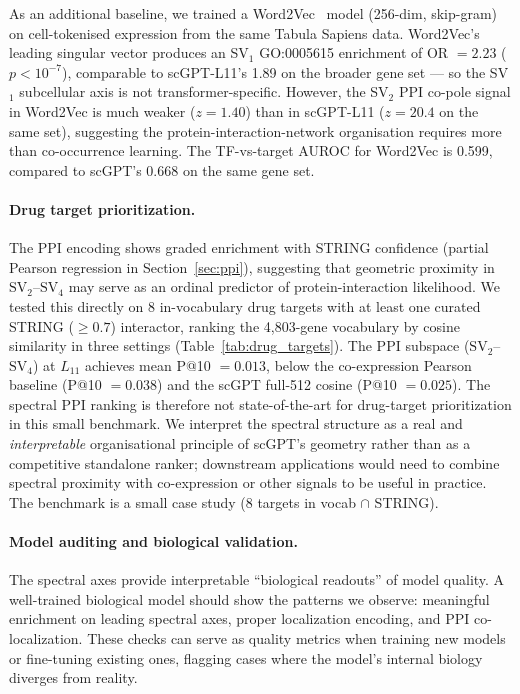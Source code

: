 \documentclass[12pt]{article}
\newcommand{\SV}[1]{\mathrm{SV}_{#1}}
\begin{document}
As an additional baseline, we trained a Word2Vec~\cite{mikolov2013word2vec} model (256-dim, skip-gram) on cell-tokenised expression from the same Tabula Sapiens data.
Word2Vec's leading singular vector produces an SV$_1$ GO:0005615 enrichment of OR $= 2.23$ ($p < 10^{-7}$), comparable to scGPT-L11's 1.89 on the broader gene set --- so the SV$_1$ subcellular axis is not transformer-specific.
However, the SV$_2$ PPI co-pole signal in Word2Vec is much weaker ($z = 1.40$) than in scGPT-L11 ($z = 20.4$ on the same set), suggesting the protein-interaction-network organisation requires more than co-occurrence learning.
The TF-vs-target AUROC for Word2Vec is 0.599, compared to scGPT's 0.668 on the same gene set.

\paragraph{Drug target prioritization.}
The PPI encoding shows graded enrichment with STRING confidence (partial Pearson regression in Section~\ref{sec:ppi}), suggesting that geometric proximity in $\SV{2}$--$\SV{4}$ may serve as an ordinal predictor of protein-interaction likelihood.
We tested this directly on 8 in-vocabulary drug targets with at least one curated STRING ($\geq 0.7$) interactor, ranking the 4{,}803-gene vocabulary by cosine similarity in three settings (Table~\ref{tab:drug_targets}).
The PPI subspace ($\SV{2}$--$\SV{4}$) at $L_{11}$ achieves mean P@10 $= 0.013$, below the co-expression Pearson baseline (P@10 $= 0.038$) and the scGPT full-512 cosine (P@10 $= 0.025$).
The spectral PPI ranking is therefore not state-of-the-art for drug-target prioritization in this small benchmark.
We interpret the spectral structure as a real and \emph{interpretable} organisational principle of scGPT's geometry rather than as a competitive standalone ranker; downstream applications would need to combine spectral proximity with co-expression or other signals to be useful in practice.
The benchmark is a small case study (8 targets in vocab $\cap$ STRING).

\paragraph{Model auditing and biological validation.}
The spectral axes provide interpretable ``biological readouts'' of model quality.
A well-trained biological model should show the patterns we observe: meaningful enrichment on leading spectral axes, proper localization encoding, and PPI co-localization.
These checks can serve as quality metrics when training new models or fine-tuning existing ones, flagging cases where the model's internal biology diverges from reality.
\end{document}
